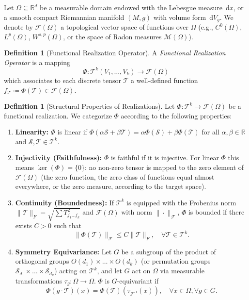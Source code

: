 \documentclass[11pt,a4paper,reqno]{amsart}
\theoremstyle{definition}
\newtheorem{definition}[theorem]{Definition}
\numberwithin{equation}{section}
\newcommand{\R}{\mathbb{R}}
\newcommand{\dif}{\,\mathrm{d}}
\begin{document}
Let $\Omega \subseteq \R^d$ be a measurable domain endowed with the Lebesgue measure $\dif x$, or a smooth compact Riemannian manifold $(M, g)$ with volume form $\dif V_g$. We denote by $\mathcal{F}(\Omega)$ a topological vector space of functions over $\Omega$ (e.g., $C^0(\Omega)$, $L^p(\Omega)$, $W^{s,p}(\Omega)$, or the space of Radon measures $\mathcal{M}(\Omega)$).

\begin{definition}[Functional Realization Operator]
\label{def:realization_op}
A \emph{Functional Realization Operator} is a mapping
\begin{equation}
    \Phi \colon \mathcal{T}^k(V_1, \dots, V_k) \longrightarrow \mathcal{F}(\Omega)
\end{equation}
which associates to each discrete tensor $\mathcal{T}$ a well-defined function $f_{\mathcal{T}} \coloneqq \Phi(\mathcal{T}) \in \mathcal{F}(\Omega)$.
\end{definition}

\begin{definition}[Structural Properties of Realizations]
Let $\Phi \colon \mathcal{T}^k \to \mathcal{F}(\Omega)$ be a functional realization. We categorize $\Phi$ according to the following properties:
\begin{enumerate}[label=(\roman*)]
    \item \textbf{Linearity:} $\Phi$ is linear if $\Phi(\alpha \mathcal{S} + \beta \mathcal{T}) = \alpha \Phi(\mathcal{S}) + \beta \Phi(\mathcal{T})$ for all $\alpha, \beta \in \R$ and $\mathcal{S}, \mathcal{T} \in \mathcal{T}^k$.
    \item \textbf{Injectivity (Faithfulness):} $\Phi$ is faithful if it is injective. For linear $\Phi$ this means $\ker(\Phi) = \{0\}$: no non-zero tensor is mapped to the zero element of $\mathcal{F}(\Omega)$ (the zero function, the zero class of functions equal almost everywhere, or the zero measure, according to the target space).
    \item \textbf{Continuity (Boundedness):} If $\mathcal{T}^k$ is equipped with the Frobenius norm $\|\mathcal{T}\|_F = \sqrt{\sum T_{j_1 \dots j_k}^2}$ and $\mathcal{F}(\Omega)$ with norm $\|\cdot\|_{\mathcal{F}}$, $\Phi$ is bounded if there exists $C > 0$ such that
    \begin{equation}
        \|\Phi(\mathcal{T})\|_{\mathcal{F}} \le C \|\mathcal{T}\|_F, \quad \forall \mathcal{T} \in \mathcal{T}^k.
    \end{equation}
    \item \textbf{Symmetry Equivariance:} Let $G$ be a subgroup of the product of orthogonal groups $O(d_1) \times \dots \times O(d_k)$ (or permutation groups $\mathcal{S}_{d_1} \times \dots \times \mathcal{S}_{d_k}$) acting on $\mathcal{T}^k$, and let $G$ act on $\Omega$ via measurable transformations $\tau_g \colon \Omega \to \Omega$. $\Phi$ is $G$-equivariant if
    \begin{equation}
        \Phi(g \cdot \mathcal{T})(x) = \Phi(\mathcal{T})(\tau_{g^{-1}}(x)), \quad \forall x \in \Omega, \forall g \in G.
    \end{equation}
\end{enumerate}
\end{definition}
\end{document}
